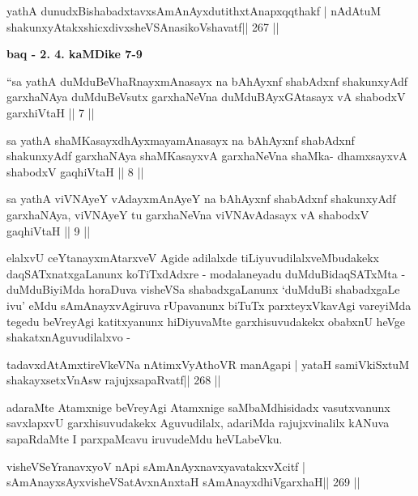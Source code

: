 
\begin{shl}
yathA dunudxBishabadxtavxsAmAnAyxdutithxtAnapxqqthakf |
nA\s\s dAtuM shakunxyAtakxshicxdivxsheVSAnasikoVshavatf\hfill || 267 ||
\end{shl}

\begin{artha}
{\bf baq - 2. 4. kaMDike 7-9}
\end{artha}

\begin{shl}
``sa yathA duMduBeVhaRnayxmAnasayx na bAhAyxnf shabAdxnf
shakunxyAdf garxhaNAya duMduBeVsutx garxhaNeVna
duMduBAyxGAtasayx vA shabodxV garxhiVtaH || 7 ||
\end{shl}

\begin{shl}
sa yathA shaMKasayxdhAyxmayamAnasayx na bAhAyxnf shabAdxnf
shakunxyAdf garxhaNAya shaMKasayxvA garxhaNeVna shaMka-
dhamxsayxvA shabodxV gaqhiVtaH || 8 ||
\end{shl}

\begin{shl}
sa yathA viVNAyeY vAdayxmAnAyeY na bAhAyxnf
shabAdxnf shakunxyAdf garxhaNAya, viVNAyeY tu garxhaNeVna
viVNAvAdasayx vA shabodxV gaqhiVtaH || 9 ||
\end{shl}

\begin{artha}
elalxvU ceYtanayxmAtarxveV Agide adilalxde tiLiyuvudilalxveMbudakekx daqSATxnatx\-gaLanunx koTiTxdAdxre - modalaneyadu duMduBidaqSATxMta - duMduBiyiMda horaDuva visheVSa shabadxgaLanunx `duMduBi shabadxgaLe ivu' eMdu sAmAnayxvAgiruva rUpavanunx biTuTx parxteyxVkavAgi vareyiMda tegedu beVreyAgi katitxyanunx hiDiyuvaMte garxhisuvudakekx obabxnU heVge shakatxnAguvudilalxvo -
\end{artha}

\begin{shl}
tadavxdAtAmxtireVkeVNa nA\s\s timxVyAthoVR manAgapi |
yataH samiVkiSxtuM shakayxsetxVnAsw rajujxsapaRvatf\hfill || 268 ||
\end{shl}

\begin{artha}
adaraMte Atamxnige beVreyAgi Atamxnige saMbaMdhisidadx vasutxvanunx savxlapxvU garxhisuvudakekx Aguvudilalx, adariMda rajujxvinalilx kANuva sapaRdaMte I parxpaMcavu iruvudeMdu heVLabeVku.
\end{artha}

\begin{shl}
visheVSeYranavxyoV nApi sAmAnAyxnavxyavatakxvXcitf |
sAmAnayxsAyxvisheVSatAvxnAnxtaH sAmAnayxdhiVgarxhaH\hfill || 269 ||
\end{shl}

